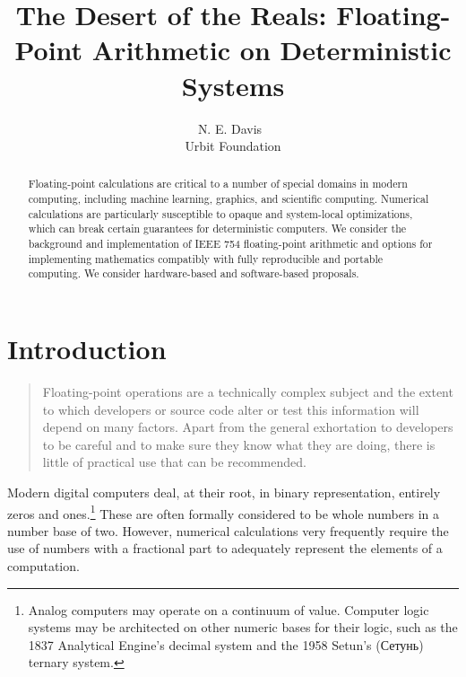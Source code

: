 \documentclass[twoside]{article}
\title{The Desert of the Reals:  Floating-Point Arithmetic on Deterministic Systems}
\author{N. E. Davis~\patp{lagrev-nocfep} \\ Urbit Foundation}
\date{}
\begin{document}
\maketitle
\thispagestyle{firststyle}

\begin{abstract}
Floating-point calculations are critical to a number of special domains in modern computing, including machine learning, graphics, and scientific computing.  Numerical calculations are particularly susceptible to opaque and system-local optimizations, which can break certain guarantees for deterministic computers.  We consider the background and implementation of IEEE 754 floating-point arithmetic and options for implementing mathematics compatibly with fully reproducible and portable computing.  We consider hardware-based and software-based proposals.
\end{abstract}

\tableofcontents

\section{Introduction}

\begin{quote}
Floating-point operations are a technically complex subject and the extent to which developers or source code alter or test this information will depend on many factors. Apart from the general exhortation to developers to be careful and to make sure they know what they are doing, there is little of practical use that can be recommended.  \citep[p.~197]{Jones2008}
\end{quote}

Modern digital computers deal, at their root, in binary representation, entirely zeros and ones.\footnote{Analog computers may operate on a continuum of value.  Computer logic systems may be architected on other numeric bases for their logic, such as the 1837 Analytical Engine's decimal system and the 1958 Setun's (Сетунь) ternary system.}  These are often formally considered to be whole numbers in a number base of two.  However, numerical calculations very frequently require the use of numbers with a fractional part to adequately represent the elements of a computation.
\end{document}

